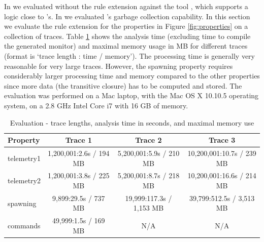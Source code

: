 \vspace{1.5ex}
In \cite{HPU,HPU-FMSD} we evaluated \dejavu{}
without the rule extension against the \monpoly{} tool \cite{agrebasin}, which supports a logic close to \dejavu's. In \cite{HP} we evaluated \dejavu's garbage collection capability. In this section we evaluate the rule extension for the properties in Figure 
\ref{fig:properties} on a collection of 
traces. Table \ref{tab:evaluation} shows the  
analysis time (excluding time to compile the 
generated monitor) and maximal memory usage in 
MB for different 
traces
(format is `trace length : time / memory'). 
%
%
%
The processing time is generally
very reasonable for very large traces. However,
the spawning property  requires considerably larger 
processing time and memory compared to the other 
properties since more data (the transitive 
closure) has to be computed and stored.
%
The evaluation was performed on a Mac laptop, with the Mac OS X 10.10.5 operating 
system, on a 2.8 GHz Intel Core i7 with 16 GB of memory.


\begin{table}[h!]
\centering
\begin{tabular}{|l|c|c|c|}
\hline
Property   & Trace 1 & Trace 2 & Trace 3 \\
\hline
telemetry1 & 1,200,001\;:\;2.6s / 194 MB & 5,200,001\;:\;5.9s / 210 MB & 10,200,001\;:\;10.7s / 239 MB \\
\hline
telemetry2 & 1,200,001\;:\;3.8s / 225 MB & 5,200,001\;:\;8.7s / 218 MB & 10,200,001\;:\;16.6s / 214 MB \\
\hline
spawning   & 9,899\;:\;29.5s / 737 MB & 19,999\;:\;117.3s / 1,153 MB & 39,799\;:\;512.5s / 3,513 MB \\
\hline
commands   & 49,999\;:\;1.5s / 169 MB & N/A & N/A \\
\hline
\end{tabular}
\caption{  Evaluation - trace lengths, analysis time in seconds, and maximal memory use}
\label{tab:evaluation}
\end{table}

